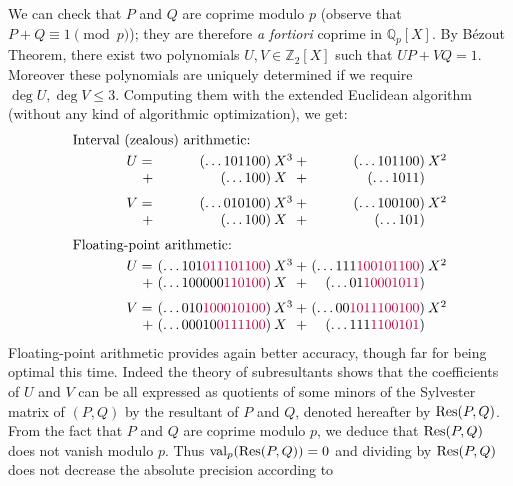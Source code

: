 \documentclass[11pt]{article}
\numberwithin{equation}{section}
\numberwithin{figure}{section}
\renewcommand{\leq}{\leqslant}
\theoremstyle{definition}
\newcommand{\Z}{\mathbb Z}
\newcommand{\Q}{\mathbb Q}
\newcommand{\Qp}{\Q_p}
\newcommand{\val}{\text{\rm val}}
\newcommand{\Res}{\text{\rm Res}}
\begin{document}
We can check that $P$ and $Q$ are coprime modulo $p$ (observe that
$P + Q \equiv 1 \pmod p$); they are therefore \emph{a fortiori} coprime
in $\Qp[X]$. By Bézout Theorem, there exist two polynomials 
$U, V \in \Z_2[X]$ such that $UP + VQ = 1$. Moreover these polynomials 
are uniquely determined if we require $\deg U, \deg V \leq 3$. Computing 
them with the extended Euclidean algorithm (without any kind of 
algorithmic optimization), we get:
$$\begin{array}{cr@{\hspace{0.2ex}}r@{\hspace{0.5ex}}l@{\hspace{0.2ex}}r@{\hspace{0.5ex}}l}
\multicolumn{6}{l}{\text{Interval (zealous) arithmetic:}}\smallskip\\
\hspace{1cm}\null
&U = {}& (\ldots 101100) & X^3 
   + {}& (\ldots 101100) & X^2 \\
&{}+ {}& (\ldots 100) & X^{\phantom{1}} 
   + {}& (\ldots 1011) \medskip \\
&V = {}& (\ldots 010100) & X^3 
   + {}& (\ldots 100100) & X^2 \\
&{}+ {}& (\ldots 100) & X^{\phantom{1}} 
   + {}& (\ldots 101) \medskip \\
\multicolumn{6}{l}{\text{Floating-point arithmetic:}}\smallskip\\
&U = {}& (\ldots 101{\color{purple}011101100}) & X^3 
   + {}& (\ldots 111{\color{purple}100101100}) & X^2 \\
&{}+ {}& (\ldots 100000{\color{purple}110100}) & X^{\phantom{1}} 
   + {}& (\ldots 01{\color{purple}10001011}) \medskip \\
&V = {}& (\ldots 010{\color{purple}100010100}) & X^3 
   + {}& (\ldots 00{\color{purple}1011100100}) & X^2 \\
&{}+ {}& (\ldots 00010{\color{purple}0111100}) & X^{\phantom{1}} 
   + {}& (\ldots 111{\color{purple}1100101})
\end{array}$$
Floating-point arithmetic provides again better accuracy, though far for 
being optimal this time. Indeed the theory of subresultants 
\cite[\S 4.1]{Wi96}
shows that the coefficients of $U$ and $V$ can be all expressed as 
quotients of some minors of the Sylvester matrix of $(P,Q)$ by the 
resultant of $P$ and $Q$, denoted hereafter by $\Res(P,Q)$. From the 
fact that $P$ and $Q$ are coprime modulo $p$, we deduce that $\Res(P,Q)$ 
does not vanish modulo $p$. Thus $\val_p(\Res(P,Q)) = 0$ and dividing by
$\Res(P,Q)$ does not decrease the absolute precision according to
\end{document}
